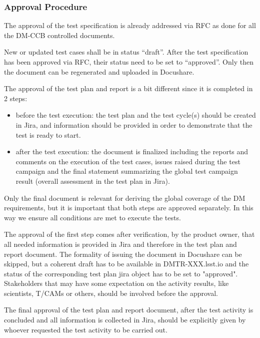\subsubsection{Approval Procedure}

The approval of the test specification is already addressed via RFC as done for all the DM-CCB controlled documents.

New or updated test cases shall be in status ``draft''. After the test specification has been approved via RFC, their status need to be set to ``approved''.
Only then the document can be regenerated and uploaded in Docushare.

The approval of the test plan and report is a bit different since it is completed in 2 steps:

\begin{itemize}
\item before the test execution: the test plan and the test cycle(s) should be created in Jira, and information should be provided in order to demonstrate that the test is ready to start.
\item after the test execution: the document is finalized including the reports and comments on the execution of the test cases, issues raised during the test campaign and the final statement summarizing the global test campaign result (overall assessment in the test plan in Jira).
\end{itemize}

Only the final document is relevant for deriving the global coverage of the DM requirements, but it is important that both steps are approved separately. In this way we ensure all conditions are met to  execute the tests.

The approval of the first step comes after verification,  by the product owner, that all needed information is provided in Jira and therefore in the test plan and report document.
The formality of  issuing  the document in Docushare can be skipped, but a coherent draft has to be available in DMTR-XXX.lsst.io and the status of the corresponding test plan jira object has to be set to "approved".
Stakeholders that may have some expectation on the activity results, like scientists, T/CAMs or others, should  be involved before the approval.

The final approval of the test plan and report document, after the test activity is concluded and all information is collected in Jira, should be explicitly given by whoever requested the test activity to be carried out.

